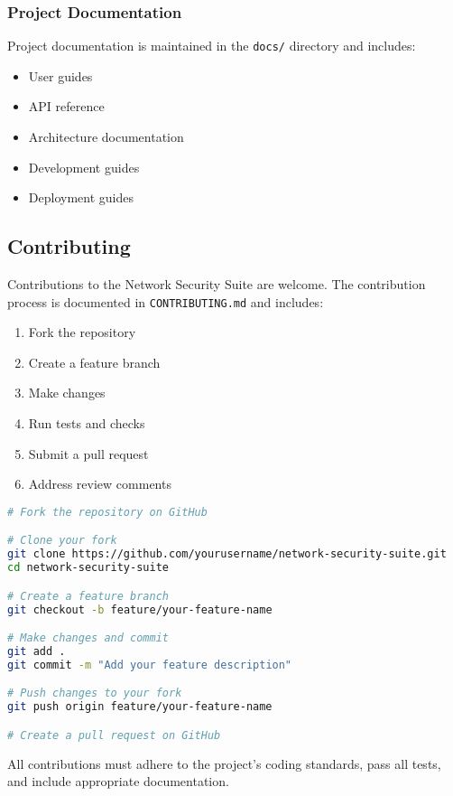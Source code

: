 \subsubsection{Project Documentation}
Project documentation is maintained in the \texttt{docs/} directory and includes:

\begin{itemize}
    \item User guides
    \item API reference
    \item Architecture documentation
    \item Development guides
    \item Deployment guides
\end{itemize}

\subsection{Contributing}
Contributions to the Network Security Suite are welcome. The contribution process is documented in \texttt{CONTRIBUTING.md} and includes:

\begin{enumerate}
    \item Fork the repository
    \item Create a feature branch
    \item Make changes
    \item Run tests and checks
    \item Submit a pull request
    \item Address review comments
\end{enumerate}

\begin{lstlisting}[language=bash, caption=Contribution Workflow]
# Fork the repository on GitHub

# Clone your fork
git clone https://github.com/yourusername/network-security-suite.git
cd network-security-suite

# Create a feature branch
git checkout -b feature/your-feature-name

# Make changes and commit
git add .
git commit -m "Add your feature description"

# Push changes to your fork
git push origin feature/your-feature-name

# Create a pull request on GitHub
\end{lstlisting}

All contributions must adhere to the project's coding standards, pass all tests, and include appropriate documentation.

